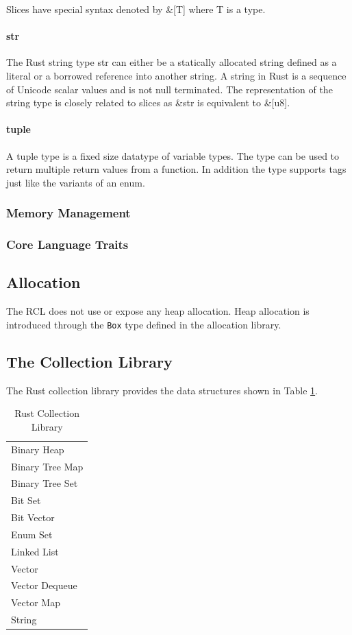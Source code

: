 Slices have special syntax denoted by \&[T] where T is a type.

\paragraph{str}
\label{par:rust:str}

The Rust string type str can either be a statically allocated string defined as a literal or a borrowed reference into another string.
A string in Rust is a sequence of Unicode scalar values and is not null terminated.
The representation of the string type is closely related to slices as \&str is equivalent to \&[u8].

\paragraph{tuple}

A tuple type is a fixed size datatype of variable types.
The type can be used to return multiple return values from a function.
In addition the type supports tags just like the variants of an enum.

\subsubsection{Memory Management}
\subsubsection{Core Language Traits}

\subsection{Allocation}
\label{sec:rust:allocation}

The RCL does not use or expose any heap allocation.
Heap allocation is introduced through the \texttt{Box} type defined in the allocation library.

\subsection{The Collection Library}

The Rust collection library provides the data structures shown in Table \ref{tab:rust:collections}.

\begin{table}[H]
  \begin{tabular}{l}
    Binary Heap \\
    Binary Tree Map \\
    Binary Tree Set \\
    Bit Set \\
    Bit Vector \\
    Enum Set \\
    Linked List \\
    Vector \\
    Vector Dequeue \\
    Vector Map \\
    String \\
  \end{tabular}
  \caption{Rust Collection Library}
  \label{tab:rust:collections}
\end{table}

